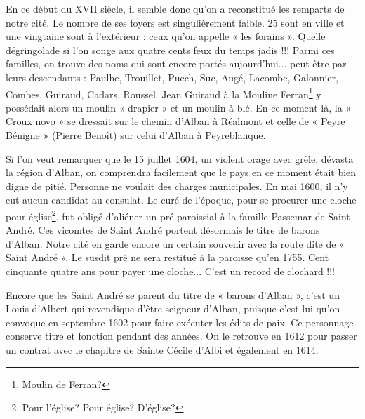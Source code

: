 En ce début du XVII\ieme{} siècle, il semble donc qu'on a
reconstitué les remparts de notre cité. Le nombre de ses
foyers est singulièrement faible. 25 sont en ville et une
vingtaine sont à l'extérieur : ceux qu'on appelle
« les forains ». Quelle dégringolade si l'on songe aux
quatre cents feux du temps jadis !!! Parmi ces familles,
on trouve des noms qui sont encore portés aujourd'hui...
peut-être par leurs descendants : Paulhe, Trouillet, Puech,
Suc, Augé, Lacombe, Galonnier, Combes, Guiraud, Cadars,
Roussel. Jean Guiraud à la Mouline Ferran\footnote{Moulin de Ferran?} y possédait
alors un moulin « drapier » et un moulin à blé. En ce
moment-là, la « Croux novo » se dressait sur le chemin
d'Alban à Réalmont et celle de « Peyre Bénigne »
(Pierre Benoît) sur celui d'Alban à Peyreblanque.

\par

Si l'on veut remarquer que le 15 juillet 1604, un violent
orage avec grêle, dévasta la région d'Alban, on comprendra
facilement que le pays en ce moment était bien digne de
pitié. Personne ne voulait des charges municipales.
En mai 1600, il n'y eut aucun candidat au consulat.
Le curé de l'époque, pour se procurer une cloche pour
église\footnote{Pour l'église? Pour église? D'église?}, fut obligé d'aliéner un pré paroissial à la famille
Passemar de Saint André. Ces vicomtes de Saint André
portent désormais le titre de barons d'Alban. Notre cité
en garde encore un certain souvenir avec la route dite
de « Saint André ». Le susdit pré ne sera restitué à la
paroisse qu'en 1755. Cent cinquante quatre ans pour
payer une cloche... C'est un record de clochard !!!

\par

Encore que les Saint André se parent du titre de
« barons d'Alban », c'est un Louis d'Albert qui revendique
d'être seigneur d'Alban, puisque c'est lui qu'on convoque
en septembre 1602 pour faire exécuter les édits de paix.
Ce personnage conserve titre et fonction pendant des
années. On le retrouve en 1612 pour passer un contrat
avec le chapitre de Sainte Cécile d'Albi et également
en 1614.